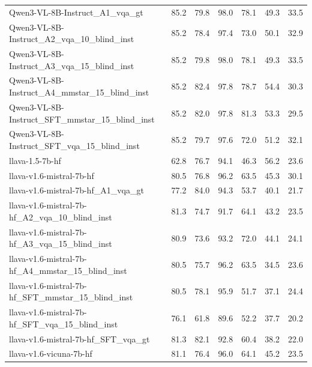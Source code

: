 \begin{tabular}{lrrrrrr}
Qwen3-VL-8B-Instruct_A1_vqa_gt & 85.2 & 79.8 & 98.0 & 78.1 & 49.3 & 33.5 \\
Qwen3-VL-8B-Instruct_A2_vqa_10_blind_inst & 85.2 & 78.4 & 97.4 & 73.0 & 50.1 & 32.9 \\
Qwen3-VL-8B-Instruct_A3_vqa_15_blind_inst & 85.2 & 79.8 & 98.0 & 78.1 & 49.3 & 33.5 \\
Qwen3-VL-8B-Instruct_A4_mmstar_15_blind_inst & 85.2 & 82.4 & 97.8 & 78.7 & 54.4 & 30.3 \\
Qwen3-VL-8B-Instruct_SFT_mmstar_15_blind_inst & 85.2 & 82.0 & 97.8 & 81.3 & 53.3 & 29.5 \\
Qwen3-VL-8B-Instruct_SFT_vqa_15_blind_inst & 85.2 & 79.7 & 97.6 & 72.0 & 51.2 & 32.1 \\
llava-1.5-7b-hf & 62.8 & 76.7 & 94.1 & 46.3 & 56.2 & 23.6 \\
llava-v1.6-mistral-7b-hf & 80.5 & 76.8 & 96.2 & 63.5 & 45.3 & 30.1 \\
llava-v1.6-mistral-7b-hf_A1_vqa_gt & 77.2 & 84.0 & 94.3 & 53.7 & 40.1 & 21.7 \\
llava-v1.6-mistral-7b-hf_A2_vqa_10_blind_inst & 81.3 & 74.7 & 91.7 & 64.1 & 43.2 & 23.5 \\
llava-v1.6-mistral-7b-hf_A3_vqa_15_blind_inst & 80.9 & 73.6 & 93.2 & 72.0 & 44.1 & 24.1 \\
llava-v1.6-mistral-7b-hf_A4_mmstar_15_blind_inst & 80.5 & 75.7 & 96.2 & 63.5 & 34.5 & 23.6 \\
llava-v1.6-mistral-7b-hf_SFT_mmstar_15_blind_inst & 80.5 & 78.1 & 95.9 & 51.7 & 37.1 & 24.4 \\
llava-v1.6-mistral-7b-hf_SFT_vqa_15_blind_inst & 76.1 & 61.8 & 89.6 & 52.2 & 37.7 & 20.2 \\
llava-v1.6-mistral-7b-hf_SFT_vqa_gt & 81.3 & 82.1 & 92.8 & 60.4 & 38.2 & 22.0 \\
llava-v1.6-vicuna-7b-hf & 81.1 & 76.4 & 96.0 & 64.1 & 45.2 & 23.5 \\
\bottomrule
\end{tabular}
